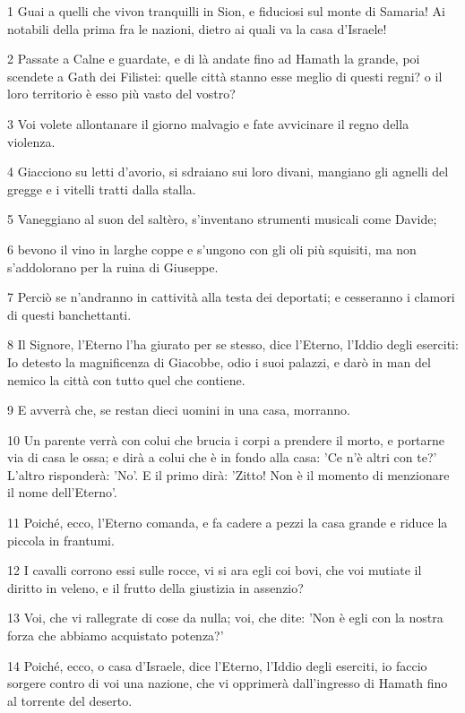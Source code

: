 \par 1 Guai a quelli che vivon tranquilli in Sion, e fiduciosi sul monte di Samaria! Ai notabili della prima fra le nazioni, dietro ai quali va la casa d'Israele!
\par 2 Passate a Calne e guardate, e di là andate fino ad Hamath la grande, poi scendete a Gath dei Filistei: quelle città stanno esse meglio di questi regni? o il loro territorio è esso più vasto del vostro?
\par 3 Voi volete allontanare il giorno malvagio e fate avvicinare il regno della violenza.
\par 4 Giacciono su letti d'avorio, si sdraiano sui loro divani, mangiano gli agnelli del gregge e i vitelli tratti dalla stalla.
\par 5 Vaneggiano al suon del saltèro, s'inventano strumenti musicali come Davide;
\par 6 bevono il vino in larghe coppe e s'ungono con gli oli più squisiti, ma non s'addolorano per la ruina di Giuseppe.
\par 7 Perciò se n'andranno in cattività alla testa dei deportati; e cesseranno i clamori di questi banchettanti.
\par 8 Il Signore, l'Eterno l'ha giurato per se stesso, dice l'Eterno, l'Iddio degli eserciti: Io detesto la magnificenza di Giacobbe, odio i suoi palazzi, e darò in man del nemico la città con tutto quel che contiene.
\par 9 E avverrà che, se restan dieci uomini in una casa, morranno.
\par 10 Un parente verrà con colui che brucia i corpi a prendere il morto, e portarne via di casa le ossa; e dirà a colui che è in fondo alla casa: 'Ce n'è altri con te?' L'altro risponderà: 'No'. E il primo dirà: 'Zitto! Non è il momento di menzionare il nome dell'Eterno'.
\par 11 Poiché, ecco, l'Eterno comanda, e fa cadere a pezzi la casa grande e riduce la piccola in frantumi.
\par 12 I cavalli corrono essi sulle rocce, vi si ara egli coi bovi, che voi mutiate il diritto in veleno, e il frutto della giustizia in assenzio?
\par 13 Voi, che vi rallegrate di cose da nulla; voi, che dite: 'Non è egli con la nostra forza che abbiamo acquistato potenza?'
\par 14 Poiché, ecco, o casa d'Israele, dice l'Eterno, l'Iddio degli eserciti, io faccio sorgere contro di voi una nazione, che vi opprimerà dall'ingresso di Hamath fino al torrente del deserto.

